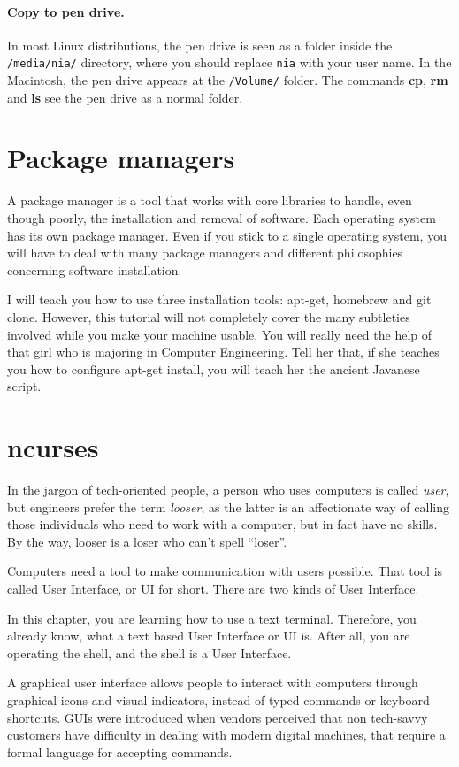 \documentclass[a4paper,12pt]{book}
\begin{document}
\paragraph{Copy to pen drive.}
In most Linux distributions, the pen drive is
seen as a folder inside the \verb|/media/nia/|
directory, where you should replace \verb|nia|
with your user name. In the Macintosh, the
pen drive appears at the \verb|/Volume/| folder.
The commands {\bf cp}, {\bf rm} and {\bf ls}
see the pen drive as a normal folder.


\section{Package managers}
A package
manager is a tool that works with
core libraries to handle, even though poorly,
the installation and removal of
software. Each operating system has its own
package manager. Even if you stick to a single
operating system, you will have to
deal with many package managers
and different philosophies concerning
software installation.


I will teach you how to use three
installation tools: apt-get,
homebrew and git clone. However,
 this tutorial will not
 completely cover the many subtleties
 involved while you make your machine usable.
You will really need the help of
that girl who is majoring in
Computer Engineering.
Tell her that, if she teaches you
how to configure apt-get install,
you will teach her the ancient
Javanese script.

\section{ncurses}
In the jargon of tech-oriented people,
a person who uses computers is called
{\em user}, but engineers
prefer the term {\em looser}, as
the latter is an affectionate way
of calling those individuals who need to work
with a computer, but in fact have no skills. By the way,
looser is a loser who can't spell ``loser''.



Computers need a tool to make communication
with users possible. That tool is
called User Interface, or UI for short.
There are two kinds of User Interface.

In this chapter, you are learning how to use a
text terminal. Therefore, you already know,
what a text based User Interface or UI is.
After all, you are operating the shell,
and the shell is a User Interface.

A graphical user interface
allows people to interact with
computers through graphical icons and
visual indicators, instead of 
typed commands or keyboard shortcuts.
GUIs were introduced when vendors
perceived that non tech-savvy customers have
difficulty in dealing with modern
digital machines, that require a formal
language for accepting commands.
\end{document}
